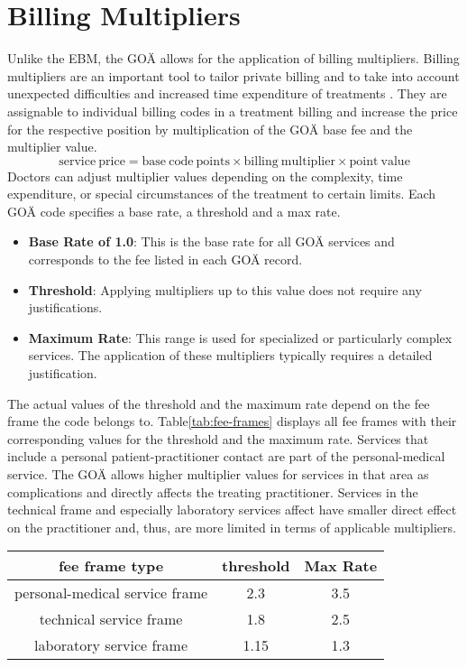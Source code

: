 \section{Billing Multipliers}\label{sec:billing-multipliers}
Unlike the EBM, the GOÄ allows for the application of billing multipliers.
Billing multipliers are an important tool to tailor private billing and to take into account unexpected difficulties and increased time expenditure of treatments \cite{walter2008abrechnung}.
They are assignable to individual billing codes in a treatment billing and increase the price for the respective position by multiplication of the GOÄ base fee and the multiplier value.
\[
    \mathrm{service\ price} = \mathrm{base\ code\ points} \times \mathrm{billing\ multiplier} \times \mathrm{point\ value}
\]
Doctors can adjust multiplier values depending on the complexity, time expenditure, or special circumstances of the treatment to certain limits.
Each GOÄ code specifies a base rate, a threshold and a max rate\cite{bruck1998kommentar}.
\begin{itemize}
    \item \textbf{Base Rate of 1.0}: This is the base rate for all GOÄ services and corresponds to the fee listed in each GOÄ record.
    \item \textbf{Threshold}: Applying multipliers up to this value does not require any justifications.
    \item \textbf{Maximum Rate}: This range is used for specialized or particularly complex services.
    The application of these multipliers typically requires a detailed justification.
\end{itemize}

The actual values of the threshold and the maximum rate depend on the fee frame the code belongs to.
Table\ref{tab:fee-frames} displays all fee frames with their corresponding values for the threshold and the maximum rate\cite{hermanns2013bemessung}.
Services that include a personal patient-practitioner contact are part of the personal-medical service.
The GOÄ allows higher multiplier values for services in that area as complications and directly affects the treating practitioner.
Services in the technical frame and especially laboratory services affect have smaller direct effect on the practitioner and, thus, are more limited in terms of applicable multipliers.
\begin{center}
    \begin{tabular}{ |c|c|c| }\label{tab:fee-frames}
        \hline
        fee frame type & threshold & Max Rate \\
        \hline
        personal-medical service frame & 2.3 & 3.5 \\
        technical service frame & 1.8 & 2.5 \\
        laboratory service frame & 1.15 & 1.3 \\
        \hline
    \end{tabular}
\end{center}

